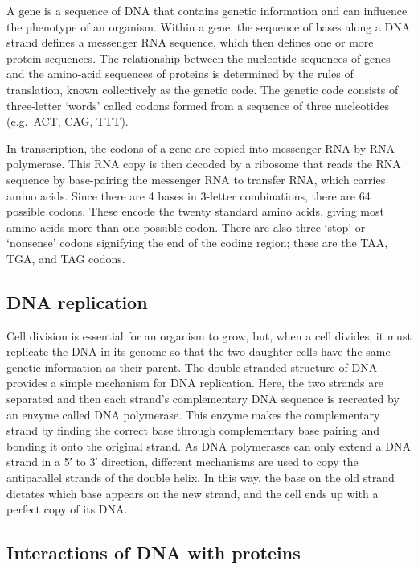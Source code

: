 A gene is a sequence of DNA that contains genetic information and can influence the phenotype of an organism. Within a gene, the sequence of bases along a DNA strand defines a messenger RNA sequence, which then defines one or more protein sequences. The relationship between the nucleotide sequences of genes and the amino-acid sequences of proteins is determined by the rules of translation, known collectively as the genetic code. The genetic code consists of three-letter `words' called codons formed from a sequence of three nucleotides (e.g.~ACT, CAG, TTT).

In transcription, the codons of a gene are copied into messenger RNA by RNA polymerase. This RNA copy is then decoded by a ribosome that reads the RNA sequence by base-pairing the messenger RNA to transfer RNA, which carries amino acids. Since there are 4 bases in 3-letter combinations, there are 64 possible codons. These encode the twenty standard amino acids, giving most amino acids more than one possible codon. There are also three `stop' or `nonsense' codons signifying the end of the coding region; these are the TAA, TGA, and TAG codons.

\hypertarget{dna-replication}{%
\subsection{DNA replication}\label{dna-replication}}

Cell division is essential for an organism to grow, but, when a cell divides, it must replicate the DNA in its genome so that the two daughter cells have the same genetic information as their parent. The double-stranded structure of DNA provides a simple mechanism for DNA replication. Here, the two strands are separated and then each strand's complementary DNA sequence is recreated by an enzyme called DNA polymerase. This enzyme makes the complementary strand by finding the correct base through complementary base pairing and bonding it onto the original strand. As DNA polymerases can only extend a DNA strand in a 5′ to 3′ direction, different mechanisms are used to copy the antiparallel strands of the double helix. In this way, the base on the old strand dictates which base appears on the new strand, and the cell ends up with a perfect copy of its DNA.

\hypertarget{interactions-of-dna-with-proteins}{%
\subsection{Interactions of DNA with proteins}\label{interactions-of-dna-with-proteins}}

